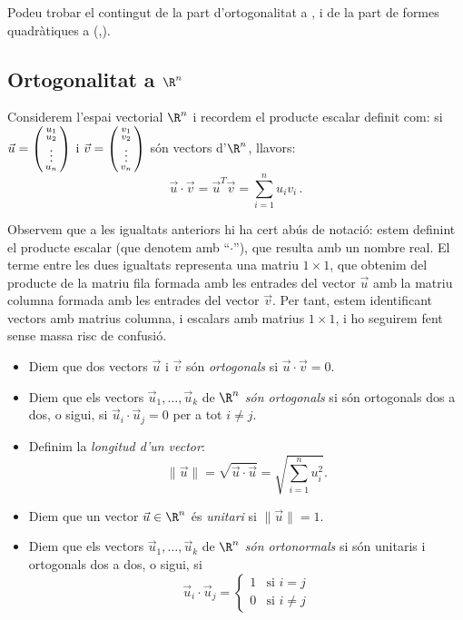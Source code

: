 

Podeu trobar el contingut de la part d'ortogonalitat a \cite[Tema 5]{Bret}, i de la part de formes quadràtiques a (\cite[Tema~8]{Bret},\cite[Tema~4]{NaXa}).
\subsection{Ortogonalitat a \texorpdfstring{$\R^n$}{Rn}}
Considerem l'espai vectorial $\R^n$ i recordem el producte escalar definit com: si $\vec u=\left(\begin{smallmatrix}u_1\\u_2\\ \vdots\\u_n\end{smallmatrix}\right)$ i $\vec v=\left(\begin{smallmatrix}v_1\\v_2\\ \vdots \\ v_n\end{smallmatrix}\right)$ són vectors d'$\R^n$, llavors:
$$
\vec u \cdot \vec v = \vec u^T \vec v=\sum_{i=1}^n u_iv_i \,.
$$
\begin{observacio}
Observem que a les igualtats anteriors hi ha cert abús de notació: estem definint el producte escalar (que denotem amb ``$\cdot$''), que resulta amb un nombre real. El terme entre les dues igualtats representa una matriu $1\times 1$, que obtenim del producte de la matriu fila formada amb les entrades del vector $\vec u$ amb la matriu columna formada amb les entrades del vector $\vec v$. Per tant, estem identificant vectors amb matrius columna, i escalars amb matrius $1\times 1$, i ho seguirem fent sense massa risc de confusió.
\end{observacio}
\begin{definicio}
\begin{itemize}
    \item Diem que dos vectors $\vec u$ i $\vec v$ són \emph{ortogonals} si $\vec u\cdot\vec v=0$.
    \item Diem que els vectors $\vec u_1, \dots, \vec u_k$ de $\R^n$ \emph{són ortogonals} si són ortogonals dos a dos, o sigui, si $\vec u_i\cdot\vec u_j=0$ per a tot $i\neq j$.
    \item Definim la \emph{longitud d'un vector}:
    $$
    \|\vec u\|=\sqrt{\vec u\cdot \vec u}=\sqrt{\sum_{i=1}^n u_i^2}.
    $$
    \item Diem que un vector $\vec u\in\R^n$ és \emph{unitari} si $\|\vec u\|=1$.

    \item Diem que els vectors $\vec u_1, \dots, \vec u_k$ de $\R^n$ \emph{són ortonormals} si són unitaris i ortogonals dos a dos, o sigui, si 
    $$\vec u_i\cdot\vec u_j=\left\{ \begin{array}{ll} 1 & \text{si $i=j$} \\ 0 & \text{si $i\neq j$}\end{array}\right.$$
\end{itemize}
\end{definicio}
